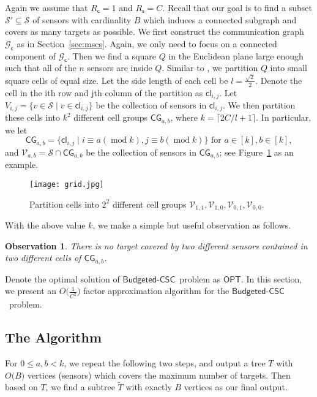 \documentclass[11pt]{article}
\newcommand{\calV}{{\mathcal V}}
\newcommand{\calS}{{\mathcal S}}
\newcommand{\OPT}{\mathsf{OPT}}
\newcommand{\bcsc}{$\mathsf{Budgeted}$-$\mathsf{CSC}$}
\newcommand{\cell}{\mathsf{cl}}
\newcommand{\cells}{\mathsf{CG}}
\renewcommand{\mod}{\operatorname{mod}}
\newcommand{\Rc}{R_\mathsf{c}}
\newcommand{\Rs}{R_\mathsf{s}}
\newcommand{\Gc}{\mathcal{G}_\mathsf{c}}
\newtheorem{observation}{Observation}
\begin{document}
Again we assume that $\Rc=1$ and $\Rs=C$.
Recall that our goal is to find a subset $\calS'\subseteq \calS$
of sensors with cardinality $B$ which induces a connected subgraph and
covers as many targets as possible.
We first construct the communication graph $\Gc$ as in Section~\ref{sec:mscs}.
Again, we only need to focus on a connected component of $\Gc$.
Then we find a square $Q$ in the Euclidean plane large enough such that all of the $n$ sensors are inside $Q$.
Similar to \cite{marathe1995simple,hunt1998nc}, we partition $Q$ into small square cells of equal size.
Let the side length of each cell be $l=\frac{\sqrt{2}}{2}$.
Denote the cell in the ith row and jth column of the partition as $\cell_{i,j}$.
Let $V_{i,j} = \{v\in \calS \mid v\in \cell_{i,j} \}$ be the collection of sensors in $\cell_{i,j}$.
We then partition these cells into $k^2$ different cell groups
$\cells_{a,b}$,
where $k = \lceil 2C/l + 1 \rceil$.
In particular, we let
$$
\cells_{a,b} = \{\cell_{i,j}\mid i\equiv a (\mod k), j\equiv b (\mod  k)\} \text{ for }a\in [k], b \in [k],
$$
and
$\calV_{a,b} = \calS \cap \cells_{a,b}$ be the collection of sensors in $\cells_{a,b}$; see Figure~\ref{fig:grid} as an example.
\begin{figure}
	\label{fig:grid}
	\caption{Partition cells into $2^2$ different cell groups $\calV_{1,1}, \calV_{1,0},\calV_{0,1},\calV_{0,0}$.}
	\centering
	\texttt{[image: grid.jpg]}
\end{figure}

With the above value $k$, we make a simple but useful observation as follows.
\begin{observation}
	\label{ob:nodoublecover}
	There is no target covered by two different sensors contained in two different cells of $\cells_{a,b}$.
\end{observation}
Denote the optimal solution of \bcsc\ problem as $\OPT$.
In this section, we present an $O\bigl(\frac{1}{C^2}\bigr)$ factor approximation algorithm
for the \bcsc\ problem.

\subsection{The Algorithm}
For $0 \leq a , b < k$, we repeat the following two steps,
and output a tree $T$ with $O\bigl(B\bigr)$ vertices (sensors) which covers the maximum number of targets.
Then based on $T$, we find a subtree $\tilde{T}$ with exactly $B$ vertices as our final output.
\end{document}
